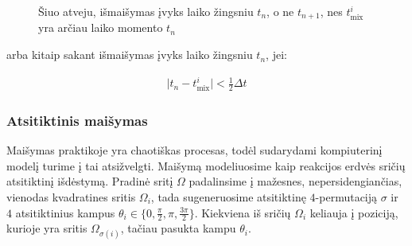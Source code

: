 \begin{figure}[!h]
\centering
\label{mix-inequality-graphic}
\caption{Šiuo atveju, išmaišymas įvyks laiko žingsniu $t_n$, o ne $t_{n+1}$, nes $t^i_\text{mix}$ yra arčiau laiko momento $t_n$}
\end{figure}

arba kitaip sakant išmaišymas įvyks laiko žingsniu $t_n$, jei:

\begin{align}
    \vert t_n - t^i_\text{mix} \vert < \frac{1}{2}\Delta t \label{mix-inequality}
\end{align}

\newpage

\subsubsection*{Atsitiktinis maišymas}

Maišymas praktikoje yra chaotiškas procesas, todėl sudarydami kompiuterinį modelį turime į tai atsižvelgti. Maišymą modeliuosime kaip reakcijos erdvės sričių atsitiktinį išdėstymą. Pradinė sritį $\Omega$ padalinsime į mažesnes, nepersidengiančias, vienodas kvadratines sritis $\Omega_i$, tada sugeneruosime atsitiktinę $4$-permutaciją $\sigma$ ir $4$ atsitiktinius kampus $\theta_i \in \{0, \frac{\pi}{2}, \pi, \frac{3\pi}{2}\}$. Kiekviena iš sričių $\Omega_i$ keliauja į poziciją, kurioje yra sritis $\Omega_{\sigma(i)}$, tačiau pasukta kampu $\theta_i$. 


